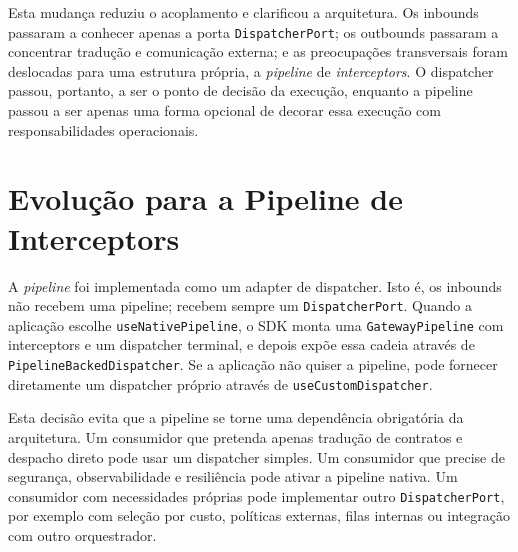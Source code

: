 \documentclass[11pt,a4paper]{report}
\begin{document}
    Esta mudança reduziu o acoplamento e clarificou a arquitetura. Os inbounds passaram a conhecer apenas a porta \texttt{DispatcherPort}; os outbounds passaram a concentrar tradução e comunicação externa; e as preocupações transversais foram deslocadas para uma estrutura própria, a \textit{pipeline} de \textit{interceptors}. O dispatcher passou, portanto, a ser o ponto de decisão da execução, enquanto a pipeline passou a ser apenas uma forma opcional de decorar essa execução com responsabilidades operacionais.

    \section{Evolução para a Pipeline de Interceptors}
    A \textit{pipeline} foi implementada como um adapter de dispatcher. Isto é, os inbounds não recebem uma pipeline; recebem sempre um \texttt{DispatcherPort}. Quando a aplicação escolhe \texttt{useNativePipeline}, o SDK monta uma \texttt{GatewayPipeline} com interceptors e um dispatcher terminal, e depois expõe essa cadeia através de \texttt{PipelineBackedDispatcher}. Se a aplicação não quiser a pipeline, pode fornecer diretamente um dispatcher próprio através de \texttt{useCustomDispatcher}.

    Esta decisão evita que a pipeline se torne uma dependência obrigatória da arquitetura. Um consumidor que pretenda apenas tradução de contratos e despacho direto pode usar um dispatcher simples. Um consumidor que precise de segurança, observabilidade e resiliência pode ativar a pipeline nativa. Um consumidor com necessidades próprias pode implementar outro \texttt{DispatcherPort}, por exemplo com seleção por custo, políticas externas, filas internas ou integração com outro orquestrador.
\end{document}
